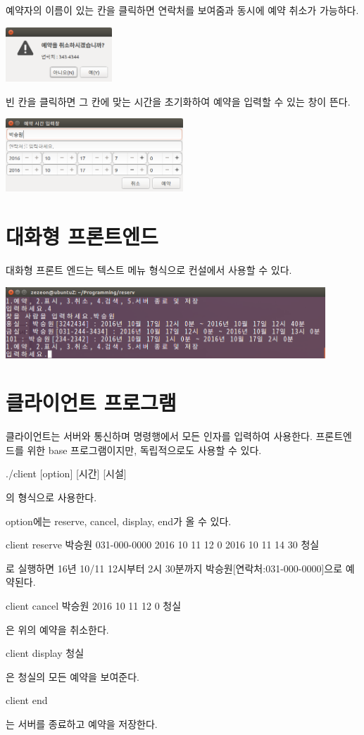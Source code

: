 \documentclass[12pt,a4paper]{report}
\begin{document}
예약자의 이름이 있는 칸을 클릭하면 연락처를 보여줌과 동시에 예약 취소가 가능하다.

\includegraphics[width=0.3\textwidth]{cancel.png}

빈 칸을 클릭하면 그 칸에 맞는 시간을 초기화하여 예약을 입력할 수 있는 창이 뜬다.

\includegraphics[width=0.5\textwidth]{reser.png}


\section{대화형 프론트엔드}

대화형 프론트 엔드는 텍스트 메뉴 형식으로 컨설에서 사용할 수 있다.

\includegraphics[width=0.9\textwidth]{con.png}

\section{클라이언트 프로그램}
클라이언트는 서버와 통신하며 명령행에서 모든 인자를 입력하여 사용한다.
프론트엔드를 위한 base 프로그램이지만, 독립적으로도 사용할 수 있다.

./client [option] [시간] [시설] 

의 형식으로 사용한다.

option에는 reserve, cancel, display, end가 올 수 있다.

client reserve 박승원 031-000-0000 2016 10 11 12 0 2016 10 11 14 30 청실  

로 실행하면 16년 10/11 12시부터 2시 30분까지 박승원[연락처:031-000-0000]으로 예약된다.

client cancel 박승원 2016 10 11 12 0 청실

은 위의 예약을 취소한다.

client display 청실 

은 청실의 모든 예약을 보여준다.

client end

는 서버를 종료하고 예약을 저장한다.
\end{document}
